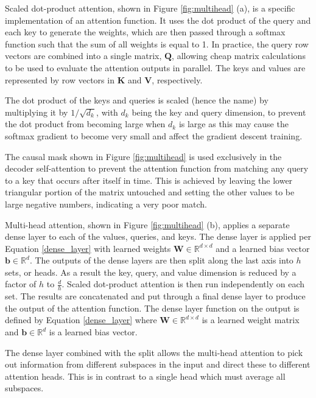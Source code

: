 Scaled dot-product attention, shown in Figure \ref{fig:multihead} (a), is a specific implementation of an attention function. 
It uses the dot product of the query and each key to generate the weights, which are then passed through a softmax function such that the sum of all weights is equal to 1.
In practice, the query row vectors are combined into a single matrix, $\boldsymbol{Q}$, allowing cheap matrix calculations to be used to evaluate the attention outputs in parallel.
The keys and values are represented by row vectors in $\boldsymbol{K}$ and $\boldsymbol{V}$, respectively.

The dot product of the keys and queries is scaled (hence the name) by multiplying it by $1 / \sqrt{d_k}$, with $d_k$ being the key and query dimension, to prevent the dot product from becoming large when $d_k$ is large as this may cause the softmax gradient to become very small and affect the gradient descent training.

The causal mask shown in Figure \ref{fig:multihead} is used exclusively in the decoder self-attention to prevent the attention function from matching any query to a key that occurs after itself in time.
This is achieved by leaving the lower triangular portion of the matrix untouched and setting the other values to be large negative numbers, indicating a very poor match.

Multi-head attention, shown in Figure \ref{fig:multihead} (b), applies a separate dense layer to each of the values, queries, and keys. 
The dense layer is applied per Equation \ref{dense_layer} with learned weights $\boldsymbol{W} \in \mathbb{R}^{d \times d}$ and a learned bias vector $\boldsymbol{b} \in \mathbb{R}^{d}$.
The outputs of the dense layers are then split along the last axis into $h$ sets, or heads.
As a result the key, query, and value dimension is reduced by a factor of $h$ to $\frac{d}{h}$.
Scaled dot-product attention is then run independently on each set.
The results are concatenated and put through a final dense layer to produce the output of the attention function.
The dense layer function on the output is defined by Equation \ref{dense_layer} where $\boldsymbol{W} \in \mathbb{R}^{d \times d}$ is a learned weight matrix and $\boldsymbol{b} \in \mathbb{R}^{d}$ is a learned bias vector.

The dense layer combined with the split allows the multi-head attention to pick out information from different subspaces in the input and direct these to different attention heads.
This is in contrast to a single head which must average all subspaces.

